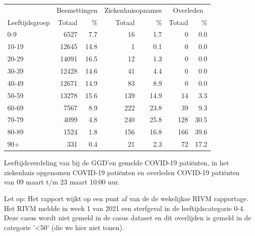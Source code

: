 \documentclass[
  english,
  man,floatsintext]{apa6}
\begin{document}
\begin{table}
\centering\begingroup\fontsize{11}{13}\selectfont

\begin{threeparttable}
\begin{tabular}{lrrrrrr}
\toprule
\multicolumn{1}{c}{ } & \multicolumn{2}{c}{Besmettingen} & \multicolumn{2}{c}{Ziekenhuisopnames} & \multicolumn{2}{c}{Overleden} \\
\cmidrule(l{3pt}r{3pt}){2-3} \cmidrule(l{3pt}r{3pt}){4-5} \cmidrule(l{3pt}r{3pt}){6-7}
Leeftijdsgroep & Totaal & \% & Totaal & \% & Totaal & \%\\
\midrule
0-9 & 6527 & 7.7 & 16 & 1.7 & 0 & 0.0\\
10-19 & 12645 & 14.8 & 1 & 0.1 & 0 & 0.0\\
20-29 & 14091 & 16.5 & 12 & 1.3 & 0 & 0.0\\
30-39 & 12428 & 14.6 & 41 & 4.4 & 0 & 0.0\\
40-49 & 12671 & 14.9 & 83 & 8.9 & 0 & 0.0\\
50-59 & 13278 & 15.6 & 139 & 14.9 & 14 & 3.3\\
60-69 & 7567 & 8.9 & 222 & 23.8 & 39 & 9.3\\
70-79 & 4099 & 4.8 & 240 & 25.8 & 128 & 30.5\\
80-89 & 1524 & 1.8 & 156 & 16.8 & 166 & 39.6\\
90+ & 331 & 0.4 & 21 & 2.3 & 72 & 17.2\\
\bottomrule
\end{tabular}
\begin{tablenotes}
\item[1] Leeftijdsverdeling van bij de GGD’en gemelde COVID-19 patiënten, in het ziekenhuis opgenomen COVID-19 patiënten en overleden COVID-19 patiënten van 09 maart t/m 23 maart 10:00 uur.
\item[2] Let op: Het rapport wijkt op een punt af van de de wekelijkse RIVM rapportage. Het RIVM meldde in week 1 van 2021 een sterfgeval in de leeftijdscategorie 0-4. Deze casus wordt niet gemeld in de casus dataset en dit overlijden is gemeld in de categorie '<50' (die we hier niet tonen).
\end{tablenotes}
\end{threeparttable}
\endgroup{}
\end{table}

\newpage
\end{document}
